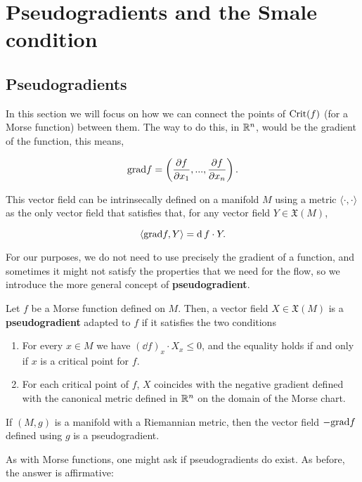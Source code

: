 \section{Pseudogradients and the Smale condition}

\subsection{Pseudogradients}

In this section we will focus on how we can connect the points of $\text{Crit}(f)$ (for a Morse function) between them. The way to do this, in $\mathbb{R}^n$, would be the gradient of the function, this means,

$$\text{grad} f = \left( \frac{\partial f}{\partial x_1},...,\frac{\partial f}{\partial x_n} \right) .$$

This vector field can be intrinsecally defined on a manifold $M$ using a metric $\langle \cdot , \cdot \rangle$ as the only vector field that satisfies that, for any vector field $Y \in \mathfrak{X}(M)$,

$$\langle \text{grad} f, Y \rangle = \operatorname d f \cdot Y .$$

For our purposes, we do not need to use precisely the gradient of a function, and sometimes it might not satisfy the properties that we need for the flow, so we introduce the more general concept of {\bf pseudogradient}.

\begin{deff}
Let $f$ be a Morse function defined on $M$. Then, a vector field $X \in \mathfrak{X}(M)$ is a {\bf pseudogradient} adapted to $f$ if it satisfies the two conditions

\begin{enumerate}
\item For every $x \in M$ we have $(\dd f)_x \cdot X_x \leq 0$, and the equality holds if and only if $x$ is a critical point for $f$.
\item For each critical point of $f$, $X$ coincides with the negative gradient defined with the canonical metric defined in $\mathbb{R}^n$ on the domain of the Morse chart.
\end{enumerate}
\end{deff}

\begin{rmrk}
If $(M,g)$ is a manifold with a Riemannian metric, then the vector field $- \text{grad} f$ defined using $g$ is a pseudogradient.
\end{rmrk}

As with Morse functions, one might ask if pseudogradients do exist. As before, the answer is affirmative:


